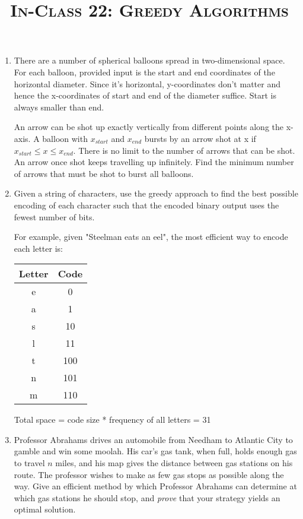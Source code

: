 \documentclass{article}
\title{\large{\textsc{In-Class 22: Greedy Algorithms}}}
\date{}
\begin{document}
\maketitle


\begin{enumerate}

\item There are a number of spherical balloons spread in two-dimensional space. For each balloon, provided input is the start and end coordinates of the horizontal diameter. Since it's horizontal, y-coordinates don't matter and hence the x-coordinates of start and end of the diameter suffice. Start is always smaller than end.

An arrow can be shot up exactly vertically from different points along the x-axis. A balloon with $x_{start}$ and $x_{end}$ bursts by an arrow shot at x if $x_{start} \leq x \leq x_{end}$. There is no limit to the number of arrows that can be shot. An arrow once shot keeps travelling up infinitely. Find the minimum number of arrows that must be shot to burst all balloons.

\item Given a string of characters, use the greedy approach to find the best possible encoding of each character such that the encoded binary output uses the fewest number of bits.

For example, given "Steelman eats an eel", the most efficient way to encode each letter is:
\begin{center}
 \begin{tabular}{||c c||}
 \hline
 Letter & Code  \\ [0.5ex]
 \hline\hline
 e & 0  \\
 \hline
 a & 1  \\
 \hline
 s & 10 \\
 \hline
 l & 11 \\
  \hline
 t & 100 \\
  \hline
 n & 101 \\
 \hline
 m & 110\\ [1ex]
 \hline

\end{tabular}
\end{center}
 Total space = code size * frequency of all letters = 31

\item Professor Abrahams drives an automobile from Needham to Atlantic City to gamble and win some moolah. His car's gas tank, when full, holds enough gas to travel $n$ miles, and his map gives the distance between gas stations on his route. The professor wishes to make as few gas stops as possible along the way. Give an efficient method by which Professor Abrahams can determine at which gas stations he should stop, and \textit{prove} that your strategy yields an optimal solution.


\end{enumerate}
\end{document}
